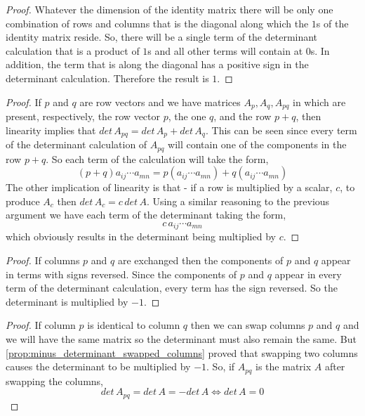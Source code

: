 \documentclass[../MathsNotesBase.tex]{subfiles}
\begin{document}
{		
		\begin{proof}
		Whatever the dimension of the identity matrix there will be only one combination of rows and columns that is the diagonal along which the $1$s of the identity matrix reside. So, there will be a single term of the determinant calculation that is a product of $1$s and all other terms will contain at $0$s. In addition, the term that is along the diagonal has a positive sign in the determinant calculation. Therefore the result is $1$.         
		\end{proof}
		
		\begin{proof}
		If $p$ and $q$ are row vectors and we have matrices $A_p, A_q, A_{pq}$ in which are present, respectively, the row vector $p$, the one $q$, and the row $p + q$, then linearity implies that $det\, A_{pq} = det\, A_{p} + det\, A_{q}$. This can be seen since every term of the determinant calculation of $A_{pq}$ will contain one of the components in the row $p+q$. So each term of the calculation will take the form,
		\[ (p + q)a_{ij}\cdots a_{mn} = p(a_{ij}\cdots a_{mn}) + q(a_{ij}\cdots a_{mn}) \]
		The other implication of linearity is that - if a row is multiplied by a scalar, $c$, to produce $A_c$ then $det\, A_c = c\,det\,A$. Using a similar reasoning to the previous argument we have each term of the determinant taking the form,
		\[ c\,a_{ij}\cdots a_{mn} \]
		which obviously results in the determinant being multiplied by $c$.
		\end{proof}
	
		\begin{proof}
			If columns $p$ and $q$ are exchanged then the components of $p$ and $q$ appear in terms with signs reversed. Since the components of $p$ and $q$ appear in every term of the determinant calculation, every term has the sign reversed. So the determinant is multiplied by $-1$.
		\end{proof}
	
		\begin{proof}
			If column $p$ is identical to column $q$ then we can swap columns $p$ and $q$ and we will have the same matrix so the determinant must also remain the same. But \autoref{prop:minus_determinant_swapped_columns} proved that swapping two columns causes the determinant to be multiplied by $-1$. So, if $A_{pq}$ is the matrix $A$ after swapping the columns,
			\[ det\, A_{pq} = det\,A = -det\,A \iff det\,A = 0 \]
		\end{proof}
	
}
\end{document}
